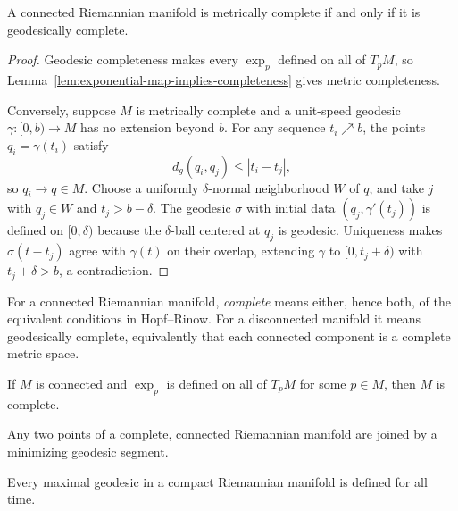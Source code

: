\begin{theorem}
\label{thm:hopf-rinow}
\leanok
A connected Riemannian manifold is metrically complete if and only if it is
geodesically complete.
\end{theorem}

\begin{proof}
\leanok
\sketch Geodesic completeness makes every $\exp_p$ defined on all of $T_pM$,
so Lemma~\ref{lem:exponential-map-implies-completeness} gives metric
completeness.

Conversely, suppose $M$ is metrically complete and a unit-speed geodesic
$\gamma\colon[0,b)\to M$ has no extension beyond $b$. For any sequence
$t_i\nearrow b$, the points $q_i=\gamma(t_i)$ satisfy
\[
d_g(q_i,q_j)\leq|t_i-t_j|,
\]
so $q_i\to q\in M$. Choose a uniformly $\delta$-normal neighborhood $W$ of
$q$, and take $j$ with $q_j\in W$ and $t_j>b-\delta$. The geodesic $\sigma$
with initial data $(q_j,\gamma'(t_j))$ is defined on $[0,\delta)$ because the
$\delta$-ball centered at $q_j$ is geodesic. Uniqueness makes
$\sigma(t-t_j)$ agree with $\gamma(t)$ on their overlap, extending $\gamma$
to $[0,t_j+\delta)$ with $t_j+\delta>b$, a contradiction.
\end{proof}

For a connected Riemannian manifold, \emph{complete} means either, hence both,
of the equivalent conditions in Hopf--Rinow. For a disconnected manifold it
means geodesically complete, equivalently that each connected component is a
complete metric space.

\begin{corollary}
\label{cor:exponential-map-defined-implies-complete}
\leanok
{}
If $M$ is connected and $\exp_p$ is defined on all of $T_pM$ for some
$p\in M$, then $M$ is complete.
\end{corollary}

\begin{corollary}
\label{cor:complete-implies-minimizing-geodesics}
Any two points of a complete, connected Riemannian manifold are joined by a
minimizing geodesic segment.
\end{corollary}

\begin{corollary}
\label{cor:compact-implies-maximal-geodesics-defined}
Every maximal geodesic in a compact Riemannian manifold is defined for all
time.
\end{corollary}

